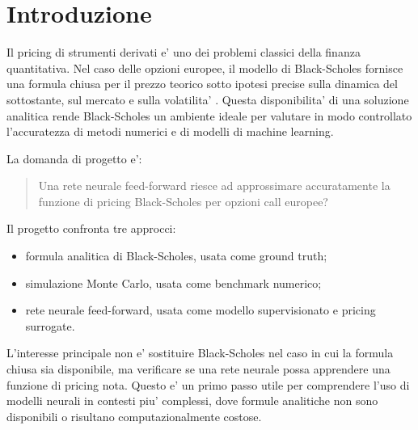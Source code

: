 \section{Introduzione}

Il pricing di strumenti derivati e' uno dei problemi classici della finanza quantitativa.
Nel caso delle opzioni europee, il modello di Black-Scholes fornisce una formula chiusa per il prezzo teorico sotto ipotesi precise sulla dinamica del sottostante, sul mercato e sulla volatilita' \cite{black1973pricing}.
Questa disponibilita' di una soluzione analitica rende Black-Scholes un ambiente ideale per valutare in modo controllato l'accuratezza di metodi numerici e di modelli di machine learning.

La domanda di progetto e':

\begin{quote}
Una rete neurale feed-forward riesce ad approssimare accuratamente la funzione di pricing Black-Scholes per opzioni call europee?
\end{quote}

Il progetto confronta tre approcci:
\begin{itemize}
    \item formula analitica di Black-Scholes, usata come ground truth;
    \item simulazione Monte Carlo, usata come benchmark numerico;
    \item rete neurale feed-forward, usata come modello supervisionato e pricing surrogate.
\end{itemize}

L'interesse principale non e' sostituire Black-Scholes nel caso in cui la formula chiusa sia disponibile, ma verificare se una rete neurale possa apprendere una funzione di pricing nota.
Questo e' un primo passo utile per comprendere l'uso di modelli neurali in contesti piu' complessi, dove formule analitiche non sono disponibili o risultano computazionalmente costose.
